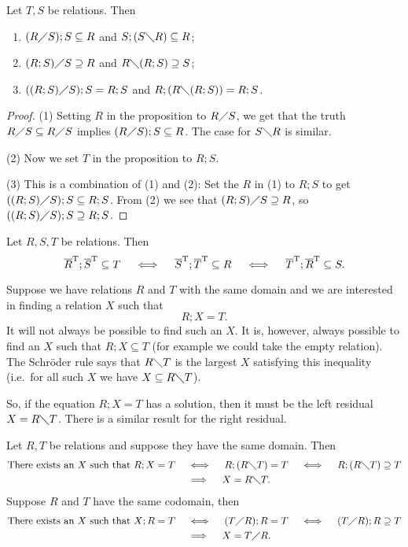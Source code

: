 \begin{corollary} \label{GaloisConnectionFromSchroderRule}
Let $T,S$ be relations. Then
\begin{enumerate}
\item $(R\diagup S);S \subseteq R$ and $S;(S\diagdown R) \subseteq R$;
\item $(R;S)\diagup S \supseteq R$ and $R\diagdown (R;S) \supseteq S$;
\item $((R;S)\diagup S);S = R;S$ and $R;(R\diagdown(R;S)) = R;S$.
\end{enumerate}
\end{corollary}
\begin{proof}
(1) Setting $R$ in the proposition to $R\diagup S$, we get that the truth $R\diagup S \subseteq R\diagup S$ implies $(R\diagup S);S \subseteq R$. The case for $S\diagdown R$ is similar.

(2) Now we set $T$ in the proposition to $R;S$.

(3) This is a combination of (1) and (2): Set the $R$ in (1) to $R;S$ to get $((R;S)\diagup S);S \subseteq R;S$. From (2) we see that $(R;S)\diagup S \supseteq R$, so $((R;S)\diagup S);S \supseteq R;S$.
\end{proof}
\begin{corollary}
Let $R,S,T$ be relations. Then
\[ \overline{R}^{\mathrm{T}};\overline{S}^{\mathrm{T}} \subseteq T \quad\iff\quad \overline{S}^{\mathrm{T}};\overline{T}^{\mathrm{T}} \subseteq R \quad\iff\quad \overline{T}^{\mathrm{T}};\overline{R}^{\mathrm{T}} \subseteq S. \]
\end{corollary}

Suppose we have relations $R$ and $T$ with the same domain and we are interested in finding a relation $X$ such that
\[ R;X = T. \]
It will not always be possible to find such an $X$. It is, however, always possible to find an $X$ such that $R;X \subseteq T$ (for example we could take the empty relation). The Schröder rule says that $R\diagdown T$ is the largest $X$ satisfying this inequality (i.e.\ for all such $X$ we have $X\subseteq R\diagdown T$).

So, if the equation $R;X = T$ has a solution, then it must be the left residual $X = R\diagdown T$. There is a similar result for the right residual.

\begin{corollary}
Let $R,T$ be relations and suppose they have the same domain. Then
\begin{align*}
\text{There exists an $X$ such that $R;X = T$} \quad&\iff\quad R;(R\diagdown T) = T \quad\iff\quad R;(R\diagdown T) \supseteq T \\
&\implies\quad X = R\diagdown T.
\end{align*}
Suppose $R$ and $T$ have the same codomain, then
\begin{align*}
\text{There exists an $X$ such that $X;R = T$} \quad&\iff\quad (T\diagup R);R = T \quad\iff\quad (T\diagup R);R \supseteq T \\
&\implies\quad X = T\diagup R.
\end{align*}
\end{corollary}

